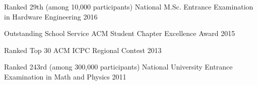 \begin{cvhonors}
  \cvhonor
    {Ranked 29th (among 10,000 participants)} %
    {National M.Sc. Entrance Examination in Hardware Engineering} %
    {} %
    {2016} %

  \cvhonor
    {Outstanding School Service} %
    {ACM Student Chapter Excellence Award} %
    {} %
    {2015} %

  \cvhonor
    {Ranked Top 30} %
    {ACM ICPC Regional Contest} %
    {} %
    {2013} %

  \cvhonor
    {Ranked 243rd (among 300,000 participants)} %
    {National University Entrance Examination in Math and Physics} %
    {} %
    {2011} %

\end{cvhonors}
